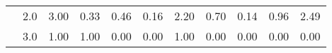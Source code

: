 \begin{tabular}{llrrrrrrrrr}
     & 2.0 &               3.00 &                     0.33 &                                 0.46 &                             0.16 &                           2.20 &                                               0.70 &                                            0.14 &                                            0.96 &                                        2.49 \\
     & 3.0 &               1.00 &                     1.00 &                                 0.00 &                             0.00 &                           1.00 &                                               0.00 &                                            0.00 &                                            0.00 &                                        0.00 \\
\bottomrule
\end{tabular}
